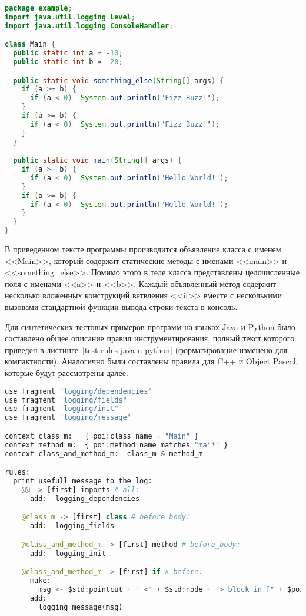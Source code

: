\begin{lstlisting}[frame=single, language=Java, label={test-java}, caption={Исходный текст тестового приложения.}]
package example;
import java.util.logging.Level;
import java.util.logging.ConsoleHandler;

class Main {
  public static int a = -10;
  public static int b = -20;

  public static void something_else(String[] args) {
    if (a >= b) {
      if (a < 0)  System.out.println("Fizz Buzz!");
    }
    if (a >= b) {
      if (a < 0)  System.out.println("Fizz Buzz!");
    }
  }

  public static void main(String[] args) {
    if (a >= b) {
      if (a < 0)  System.out.println("Hello World!");
    }
    if (a >= b) {
      if (a < 0)  System.out.println("Hello World!");
    }
  }
}
\end{lstlisting}

В приведенном тексте программы производится объявление класса с именем <<Main>>, который содержит статические методы с именами <<main>> и <<something\_else>>.
Помимо этого в теле класса представлены целочисленные поля с именами <<a>> и <<b>>.
Каждый объявленный метод содержит несколько вложенных конструкций ветвления <<if>> вместе с несколькими вызовами стандартной функции вывода строки текста в консоль.

Для синтетических тестовых примеров программ на языках Java и Python было составлено общее описание правил инструментирования, полный текст которого приведен в листинге~\ref{test-rules-java-n-python} (форматирование изменено для компактности).
Аналогично были составлены правила для C++ и Object Pascal, которые будут рассмотрены далее.

\begin{lstlisting}[frame=single, language=Python, label={test-rules-java-n-python}, caption={Описание правил инструментирования.}]
use fragment "logging/dependencies"
use fragment "logging/fields"
use fragment "logging/init"
use fragment "logging/message"

context class_m:   { poi:class_name = "Main" }
context method_m:  { poi:method_name matches "mai*" }
context class_and_method_m:  class_m & method_m

rules:
  print_usefull_message_to_the_log:
    @@ -> [first] imports # all:
      add:  logging_dependencies

    @class_m -> [first] class # before_body:
      add:  logging_fields

    @class_and_method_m -> [first] method # before_body:
      add:  logging_init

    @class_and_method_m -> [first] if # before:
      make:
        msg <- $std:pointcut + " <" + $std:node + "> block in [" + $poi:class_name + "] class, in {" + $poi:method_name + "} method";
      add:
        logging_message(msg)
\end{lstlisting}

